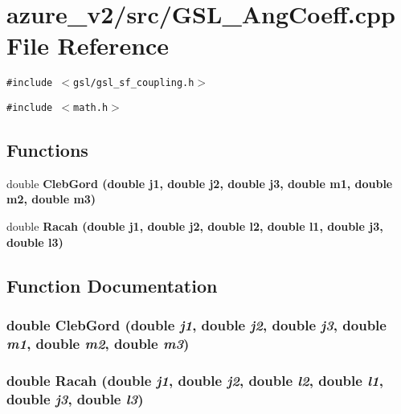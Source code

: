 \section{azure\_\-v2/src/GSL\_\-Ang\-Coeff.cpp File Reference}
\label{GSL__AngCoeff_8cpp}
{\tt \#include $<$gsl/gsl\_\-sf\_\-coupling.h$>$}\par
{\tt \#include $<$math.h$>$}\par
\subsection*{Functions}
\begin{CompactItemize}
\item 
double \bf{Cleb\-Gord} (double j1, double j2, double j3, double m1, double m2, double m3)
\item 
double \bf{Racah} (double j1, double j2, double l2, double l1, double j3, double l3)
\end{CompactItemize}


\subsection{Function Documentation}
\subsubsection{\setlength{\rightskip}{0pt plus 5cm}double Cleb\-Gord (double {\em j1}, double {\em j2}, double {\em j3}, double {\em m1}, double {\em m2}, double {\em m3})}\label{GSL__AngCoeff_8cpp_5cdeb8cd886968d1ad513bc49cc85abe}


\subsubsection{\setlength{\rightskip}{0pt plus 5cm}double Racah (double {\em j1}, double {\em j2}, double {\em l2}, double {\em l1}, double {\em j3}, double {\em l3})}\label{GSL__AngCoeff_8cpp_44340556e29961f79fd5953ddb1c4d9f}



